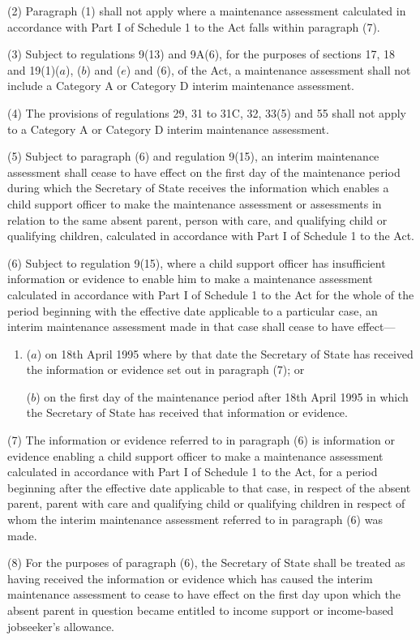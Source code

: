 \documentclass[a4paper]{article}
\begin{document}
(2) Paragraph (1) shall not apply where a maintenance assessment calculated in accordance with Part I of Schedule 1 to the Act falls within paragraph (7).

(3) Subject to regulations 9(13) and 9A(6), for the purposes of sections 17, 18 and 19(1)($a$), ($b$) and ($e$) and (6), of the Act, a maintenance assessment shall not include a Category A or Category D interim maintenance assessment.

(4) The provisions of regulations 29, 31 to 31C, 32, 33(5) and 55 shall not apply to a Category A or Category D interim maintenance assessment.

(5) Subject to paragraph (6) and regulation 9(15), an interim maintenance assessment shall cease to have effect on the first day of the maintenance period during which the Secretary of State receives the information which enables a child support officer to make the maintenance assessment or assessments in relation to the same absent parent, person with care, and qualifying child or qualifying children, calculated in accordance with Part I of Schedule 1 to the Act.

(6) Subject to regulation 9(15), where a child support officer has insufficient information or evidence to enable him to make a maintenance assessment calculated in accordance with Part I of Schedule 1 to the Act for the whole of the period beginning with the effective date applicable to a particular case, an interim maintenance assessment made in that case shall cease to have effect—
\begin{enumerate}\item[]
($a$) on 18th April 1995 where by that date the Secretary of State has received the information or evidence set out in paragraph (7); or

($b$) on the first day of the maintenance period after 18th April 1995 in which the Secretary of State has received that information or evidence.
\end{enumerate}

(7) The information or evidence referred to in paragraph (6) is information or evidence enabling a child support officer to make a maintenance assessment calculated in accordance with Part I of Schedule 1 to the Act, for a period beginning after the effective date applicable to that case, in respect of the absent parent, parent with care and qualifying child or qualifying children in respect of whom the interim maintenance assessment referred to in paragraph (6) was made.

(8) For the purposes of paragraph (6), the Secretary of State shall be treated as having received the information or evidence which has caused the interim maintenance assessment to cease to have effect on the first day upon which the absent parent in question became entitled to income support
or income-based jobseeker’s allowance.  %
\end{document}
